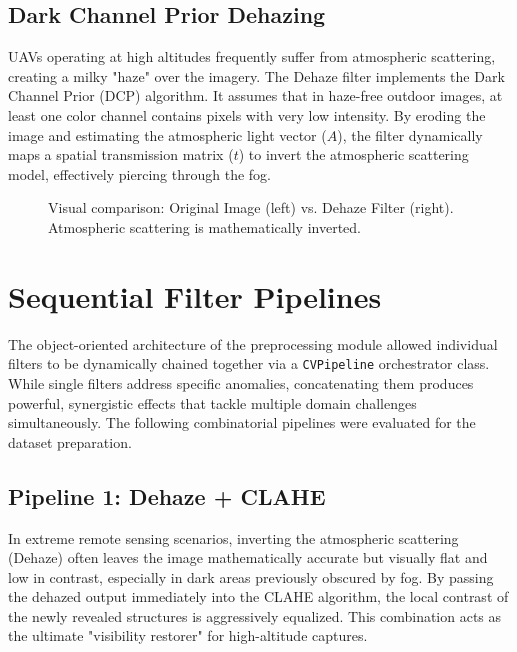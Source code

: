 \subsection{Dark Channel Prior Dehazing}
UAVs operating at high altitudes frequently suffer from atmospheric scattering, creating a milky "haze" over the imagery. The Dehaze filter implements the Dark Channel Prior (DCP) algorithm. It assumes that in haze-free outdoor images, at least one color channel contains pixels with very low intensity. By eroding the image and estimating the atmospheric light vector ($A$), the filter dynamically maps a spatial transmission matrix ($t$) to invert the atmospheric scattering model, effectively piercing through the fog.

\begin{figure}[hbt!]
    \centering
    \caption{Visual comparison: Original Image (left) vs. Dehaze Filter (right). Atmospheric scattering is mathematically inverted.}
    \label{fig:filter_dehaze}
\end{figure}



\section{Sequential Filter Pipelines}
The object-oriented architecture of the preprocessing module allowed individual filters to be dynamically chained together via a \texttt{CVPipeline} orchestrator class. While single filters address specific anomalies, concatenating them produces powerful, synergistic effects that tackle multiple domain challenges simultaneously. The following combinatorial pipelines were evaluated for the dataset preparation.

\subsection{Pipeline 1: Dehaze + CLAHE}
In extreme remote sensing scenarios, inverting the atmospheric scattering (Dehaze) often leaves the image mathematically accurate but visually flat and low in contrast, especially in dark areas previously obscured by fog. By passing the dehazed output immediately into the CLAHE algorithm, the local contrast of the newly revealed structures is aggressively equalized. This combination acts as the ultimate "visibility restorer" for high-altitude captures.

